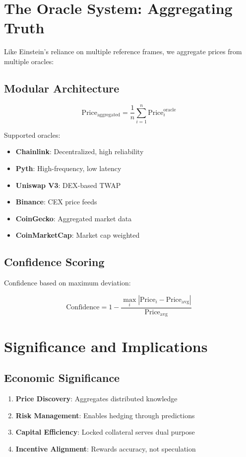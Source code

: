 \documentclass[12pt,a4paper]{article}
\begin{document}
\section{The Oracle System: Aggregating Truth}

Like Einstein's reliance on multiple reference frames, we aggregate prices from multiple oracles:

\subsection{Modular Architecture}
\begin{equation}
\text{Price}_{\text{aggregated}} = \frac{1}{n} \sum_{i=1}^{n} \text{Price}_i^{\text{oracle}}
\end{equation}

Supported oracles:
\begin{itemize}
\item \textbf{Chainlink}: Decentralized, high reliability
\item \textbf{Pyth}: High-frequency, low latency
\item \textbf{Uniswap V3}: DEX-based TWAP
\item \textbf{Binance}: CEX price feeds
\item \textbf{CoinGecko}: Aggregated market data
\item \textbf{CoinMarketCap}: Market cap weighted
\end{itemize}

\subsection{Confidence Scoring}
Confidence based on maximum deviation:

\begin{equation}
\text{Confidence} = 1 - \frac{\max_i |\text{Price}_i - \text{Price}_{\text{avg}}|}{\text{Price}_{\text{avg}}}
\end{equation}

\section{Significance and Implications}

\subsection{Economic Significance}
\begin{enumerate}
\item \textbf{Price Discovery}: Aggregates distributed knowledge
\item \textbf{Risk Management}: Enables hedging through predictions
\item \textbf{Capital Efficiency}: Locked collateral serves dual purpose
\item \textbf{Incentive Alignment}: Rewards accuracy, not speculation
\end{enumerate}
\end{document}
